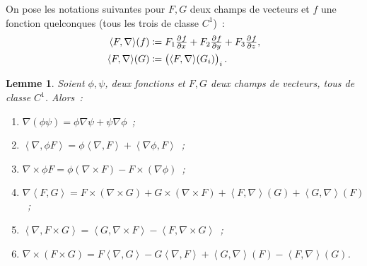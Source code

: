 \documentclass{article}
\newcommand{\scpr}[2]{{\left\langle#1, #2\right\rangle}}
\newcommand{\divg}[1]{\scpr \nabla {#1}}
\newcommand{\rot}[1]{\nabla \times #1}
\newtheorem{lem}[thm]{Lemme}
\theoremstyle{definition}
\theoremstyle{remark}
\begin{document}
		On pose les notations suivantes pour $F, G$ deux champs de vecteurs et $f$ une fonction quelconques (tous les trois de classe $C^1$)~:
		\begin{align*}
			\scpr F\nabla(f) &\coloneqq F_1\pd fx + F_2\pd fy + F_3\pd fz, \\
			\scpr F\nabla(G) &\coloneqq \left(\scpr F\nabla(G_i)\right)_i.
		\end{align*}

		\begin{lem} Soient $\phi, \psi$, deux fonctions et $F, G$ deux champs de vecteurs, tous de classe $C^1$. Alors~:
		\begin{enumerate}
			\item $\nabla(\phi\psi) = \phi\nabla\psi + \psi\nabla\phi$~;
			\item $\divg {\phi F} = \phi\divg F + \scpr {\nabla\phi}F$~;
			\item $\rot {\phi F} = \phi(\rot F) - F \times (\nabla \phi)$~;
			\item $\nabla \scpr FG = F \times (\rot G) + G \times (\rot F) + \scpr F\nabla(G) + \scpr G\nabla(F)$~;
			\item $\divg {F \times G} = \scpr G{\rot F} - \scpr F{\rot G}$~;
			\item $\rot (F \times G) = F \divg G - G \divg F + \scpr G\nabla(F) - \scpr F\nabla(G)$.
		\end{enumerate}
		\end{lem}
\end{document}
